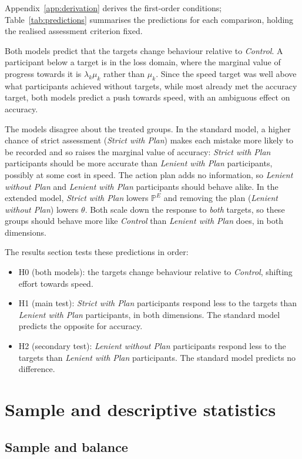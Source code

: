 \documentclass[12pt, letterpaper]{article}
\newcommand{\CtrlName}{Control}
\newcommand{\LPName}{Lenient with Plan}
\newcommand{\SPName}{Strict with Plan}
\newcommand{\LNName}{Lenient without Plan}
\newcommand{\Ctrl}{\textit{\CtrlName}}
\newcommand{\LP}{\textit{\LPName}}
\newcommand{\SP}{\textit{\SPName}}
\newcommand{\LN}{\textit{\LNName}}
\begin{document}
Appendix~\ref{app:derivation} derives the first-order conditions; Table~\ref{tab:predictions} summarises the predictions for each comparison, holding the realised assessment criterion fixed.

Both models predict that the targets change behaviour relative to \Ctrl{}. A participant below a target is in the loss domain, where the marginal value of progress towards it is $\lambda_k \mu_k$ rather than $\mu_k$. Since the speed target was well above what participants achieved without targets, while most already met the accuracy target, both models predict a push towards speed, with an ambiguous effect on accuracy.

The models disagree about the treated groups. In the standard model, a higher chance of strict assessment (\SP{}) makes each mistake more likely to be recorded and so raises the marginal value of accuracy: \SP{} participants should be more accurate than \LP{} participants, possibly at some cost in speed. The action plan adds no information, so \LN{} and \LP{} participants should behave alike. In the extended model, \SP{} lowers $\mathbb{P}^E$ and removing the plan (\LN{}) lowers $\theta$. Both scale down the response to \emph{both} targets, so these groups should behave more like \Ctrl{} than \LP{} does, in both dimensions.

\noindent The results section tests these predictions in order:

\begin{itemize}
\item H0 (both models): the targets change behaviour relative to \Ctrl{}, shifting effort towards speed.
\item H1 (main test): \SP{} participants respond less to the targets than \LP{} participants, in both dimensions. The standard model predicts the opposite for accuracy.
\item H2 (secondary test): \LN{} participants respond less to the targets than \LP{} participants. The standard model predicts no difference.
\end{itemize}

\section{Sample and descriptive statistics}

\subsection{Sample and balance}
\end{document}
